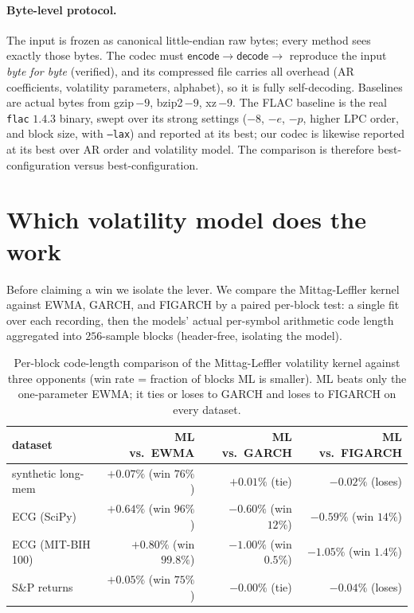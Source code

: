 \documentclass[11pt,reqno]{amsart}
\theoremstyle{plain}
\theoremstyle{remark}
\begin{document}
\paragraph{Byte-level protocol.} The input is frozen as canonical little-endian
raw bytes; every method sees exactly those bytes. The codec must
$\textsf{encode}\to\textsf{decode}\to$ reproduce the input \emph{byte for byte}
(verified), and its compressed file carries all overhead (AR coefficients,
volatility parameters, alphabet), so it is fully self-decoding. Baselines are
actual bytes from gzip\,$-9$, bzip2\,$-9$, xz\,$-9$. The FLAC baseline is the
real \texttt{flac} $1.4.3$ binary, swept over its strong settings
($-8$, $-e$, $-p$, higher LPC order, and block size, with \texttt{--lax}) and
reported at its best; our codec is likewise reported at its best over AR order
and volatility model. The comparison is therefore best-configuration versus
best-configuration.

\section{Which volatility model does the work}
\label{sec:vol}

Before claiming a win we isolate the lever. We compare the Mittag-Leffler kernel
against EWMA, GARCH, and FIGARCH by a paired per-block test: a single fit over
each recording, then the models' actual per-symbol arithmetic code length
aggregated into $256$-sample blocks (header-free, isolating the model).

\begin{table}[h]
\centering\small
\begin{tabular}{lrrr}
\toprule
dataset & ML vs.\ EWMA & ML vs.\ GARCH & ML vs.\ FIGARCH\\
\midrule
synthetic long-mem & $+0.07\%$ (win $76\%$) & $+0.01\%$ (tie) & $-0.02\%$ (loses)\\
ECG (SciPy)        & $+0.64\%$ (win $96\%$) & $-0.60\%$ (win $12\%$) & $-0.59\%$ (win $14\%$)\\
ECG (MIT-BIH 100)  & $+0.80\%$ (win $99.8\%$) & $-1.00\%$ (win $0.5\%$) & $-1.05\%$ (win $1.4\%$)\\
S\&P returns       & $+0.05\%$ (win $75\%$) & $-0.00\%$ (tie) & $-0.04\%$ (loses)\\
\bottomrule
\end{tabular}
\caption{Per-block code-length comparison of the Mittag-Leffler volatility
kernel against three opponents (win rate = fraction of blocks ML is smaller).
ML beats only the one-parameter EWMA; it ties or loses to GARCH and loses to
FIGARCH on every dataset.}
\label{tab:vol}
\end{table}
\end{document}

